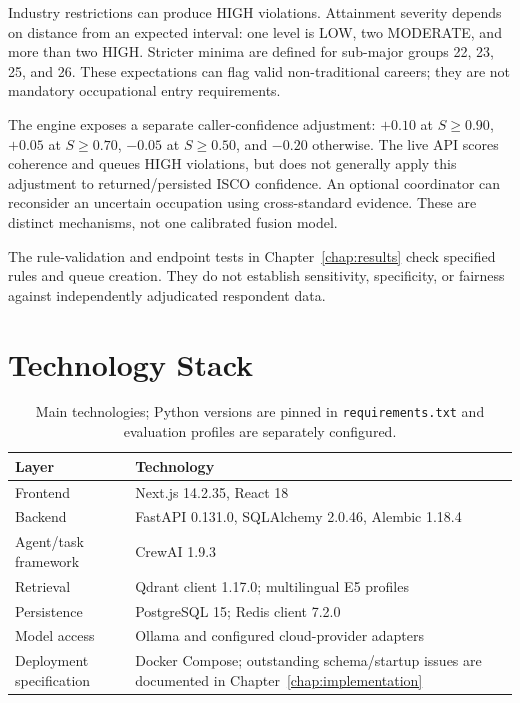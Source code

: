 Industry restrictions can produce HIGH violations. Attainment severity
depends on distance from an expected interval: one level is LOW, two
MODERATE, and more than two HIGH. Stricter minima are defined for
sub-major groups 22, 23, 25, and 26. These expectations can flag valid
non-traditional careers; they are not mandatory occupational entry
requirements.

The engine exposes a separate caller-confidence adjustment:
$+0.10$ at $S\geq0.90$, $+0.05$ at $S\geq0.70$, $-0.05$ at
$S\geq0.50$, and $-0.20$ otherwise. The live API scores
coherence and queues HIGH violations, but does not generally apply this
adjustment to returned/persisted ISCO confidence. An optional coordinator
can reconsider an uncertain occupation using cross-standard evidence.
These are distinct mechanisms, not one calibrated fusion model.

The rule-validation and endpoint tests in Chapter~\ref{chap:results}
check specified rules and queue creation. They do not establish
sensitivity, specificity, or fairness against independently adjudicated
respondent data.

\section{Technology Stack}
\label{sec:arch-stack}

\begin{table}[htbp]
\centering
\caption{Main technologies; Python versions are pinned in
\texttt{requirements.txt} and evaluation profiles are separately configured.}
\label{tab:ch3-stack}
\small
\begin{tabularx}{\textwidth}{@{}>{\raggedright\arraybackslash}p{3.2cm}X@{}}
\toprule
\textbf{Layer}&\textbf{Technology}\\
\midrule
Frontend&Next.js 14.2.35, React 18\\
Backend&FastAPI 0.131.0, SQLAlchemy 2.0.46, Alembic 1.18.4\\
Agent/task framework&CrewAI 1.9.3\\
Retrieval&Qdrant client 1.17.0; multilingual E5 profiles\\
Persistence&PostgreSQL 15; Redis client 7.2.0\\
Model access&Ollama and configured cloud-provider adapters\\
Deployment specification&Docker Compose; outstanding schema/startup issues
are documented in Chapter~\ref{chap:implementation}\\
\bottomrule
\end{tabularx}
\end{table}

